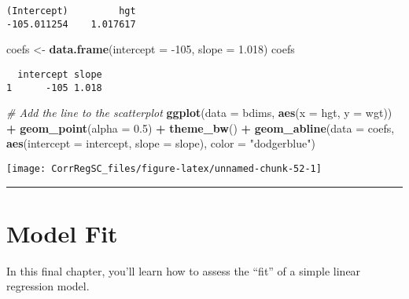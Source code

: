 \documentclass[
]{book}
\newenvironment{Shaded}{\begin{snugshade}}{\end{snugshade}}
\newcommand{\CommentTok}[1]{\textcolor[rgb]{0.56,0.35,0.01}{\textit{#1}}}
\newcommand{\DataTypeTok}[1]{\textcolor[rgb]{0.13,0.29,0.53}{#1}}
\newcommand{\DecValTok}[1]{\textcolor[rgb]{0.00,0.00,0.81}{#1}}
\newcommand{\FloatTok}[1]{\textcolor[rgb]{0.00,0.00,0.81}{#1}}
\newcommand{\KeywordTok}[1]{\textcolor[rgb]{0.13,0.29,0.53}{\textbf{#1}}}
\newcommand{\NormalTok}[1]{#1}
\newcommand{\OperatorTok}[1]{\textcolor[rgb]{0.81,0.36,0.00}{\textbf{#1}}}
\newcommand{\StringTok}[1]{\textcolor[rgb]{0.31,0.60,0.02}{#1}}
\begin{document}
\begin{verbatim}
(Intercept)         hgt 
-105.011254    1.017617 
\end{verbatim}

\begin{Shaded}
\begin{Highlighting}[]
\NormalTok{coefs <-}\StringTok{ }\KeywordTok{data.frame}\NormalTok{(}\DataTypeTok{intercept =} \DecValTok{-105}\NormalTok{, }\DataTypeTok{slope =} \FloatTok{1.018}\NormalTok{)}
\NormalTok{coefs}
\end{Highlighting}
\end{Shaded}

\begin{verbatim}
  intercept slope
1      -105 1.018
\end{verbatim}

\begin{Shaded}
\begin{Highlighting}[]
\CommentTok{# Add the line to the scatterplot}
\KeywordTok{ggplot}\NormalTok{(}\DataTypeTok{data =}\NormalTok{ bdims, }\KeywordTok{aes}\NormalTok{(}\DataTypeTok{x =}\NormalTok{ hgt, }\DataTypeTok{y =}\NormalTok{ wgt)) }\OperatorTok{+}
\StringTok{  }\KeywordTok{geom_point}\NormalTok{(}\DataTypeTok{alpha =} \FloatTok{0.5}\NormalTok{) }\OperatorTok{+}\StringTok{ }
\StringTok{  }\KeywordTok{theme_bw}\NormalTok{() }\OperatorTok{+}\StringTok{ }
\StringTok{  }\KeywordTok{geom_abline}\NormalTok{(}\DataTypeTok{data =}\NormalTok{ coefs, }
              \KeywordTok{aes}\NormalTok{(}\DataTypeTok{intercept =}\NormalTok{ intercept, }\DataTypeTok{slope =}\NormalTok{ slope),  }
              \DataTypeTok{color =} \StringTok{"dodgerblue"}\NormalTok{)}
\end{Highlighting}
\end{Shaded}

\begin{center}\texttt{[image: CorrRegSC\_files/figure-latex/unnamed-chunk-52-1]} \end{center}

\begin{center}\rule{0.5\linewidth}{0.5pt}\end{center}

\hypertarget{model-fit}{%
\chapter{Model Fit}\label{model-fit}}

In this final chapter, you'll learn how to assess the ``fit'' of a simple linear regression model.
\end{document}
